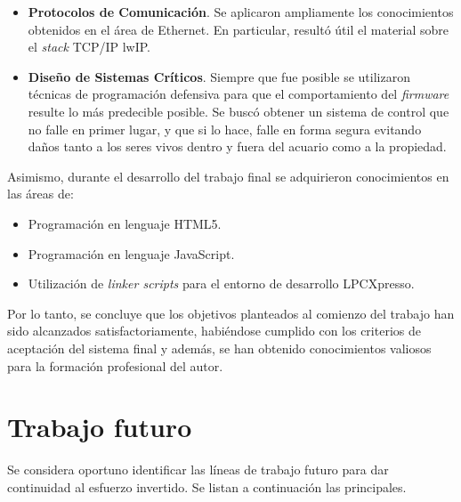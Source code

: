 \begin{itemize}
\item 
\textbf{Protocolos de Comunicación}. Se aplicaron ampliamente los conocimientos obtenidos en el área de Ethernet. En particular, resultó útil el material sobre el \textit{stack} TCP/IP lwIP.

\item
\textbf{Diseño de Sistemas Críticos}. Siempre que fue posible se utilizaron técnicas de programación defensiva para que el comportamiento del \textit{firmware} resulte lo más predecible posible.  Se buscó obtener un sistema de control que no falle en primer lugar, y que si lo hace, falle en forma segura evitando daños tanto a los seres vivos dentro y fuera del acuario como a la propiedad.
\end{itemize}



\medskip

\noindent Asimismo, durante el desarrollo del trabajo final se adquirieron conocimientos en las áreas de:

\begin{itemize}
	\item Programación en lenguaje HTML5.
	\item Programación en lenguaje JavaScript.  
	\item Utilización de \textit{linker scripts} para el entorno de desarrollo LPCXpresso.
\end{itemize}


\medskip

Por lo tanto, se concluye que los objetivos planteados al comienzo del trabajo han sido alcanzados satisfactoriamente, habiéndose cumplido con los criterios de aceptación del sistema final y además, se han obtenido conocimientos valiosos para la formación profesional del autor.

\clearpage
\section{Trabajo futuro}

Se considera oportuno identificar las líneas de trabajo futuro para dar continuidad al esfuerzo invertido.  Se listan a continuación las principales.

